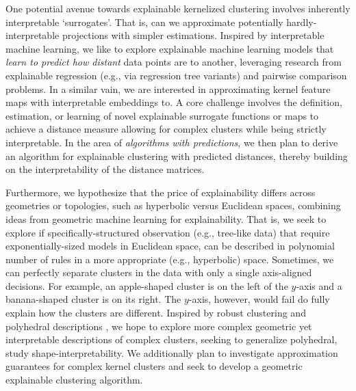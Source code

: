 \documentclass[a4paper,11pt]{article}
\begin{document}
One potential avenue towards explainable kernelized clustering involves inherently interpretable `surrogates'.
That is, can we approximate potentially hardly-interpretable projections with simpler estimations.
Inspired by interpretable machine learning, we like to explore explainable machine learning models that \emph{learn to predict how distant} data points are to another, leveraging research from explainable regression (e.g., via regression tree variants) and pairwise comparison problems.
In a similar vain, we are interested in approximating kernel feature maps with interpretable embeddings to. 
A core challenge involves the definition, estimation, or learning of novel explainable surrogate functions or maps to achieve a distance measure allowing for complex clusters while being strictly interpretable.
In the area of \emph{algorithms with predictions}, we then plan to derive an algorithm for explainable clustering with predicted distances, thereby building on the interpretability of the distance matrices.

Furthermore, we hypothesize that the price of explainability differs across geometries or topologies, such as hyperbolic versus Euclidean spaces, combining ideas from geometric machine learning for explainability. 
That is, we seek to explore if specifically-structured observation (e.g., tree-like data) that require exponentially-sized models in Euclidean space, can be described in polynomial number of rules in a more appropriate (e.g., hyperbolic) space.
Sometimes, we can perfectly separate clusters in the data with only a single axis-aligned decisions.
For example, an apple-shaped cluster is on the left of the $y$-axis and a banana-shaped cluster is on its right. 
The $y$-axis, however, would fail do fully explain how the clusters are different.
Inspired by robust clustering and polyhedral descriptions \cite{lawless2023polyhedral},
we hope to explore more complex geometric yet interpretable descriptions of complex clusters, seeking to generalize polyhedral, study shape-interpretability. 
We additionally plan to investigate approximation guarantees for complex kernel clusters and seek to develop a geometric explainable clustering algorithm.

\end{document}
